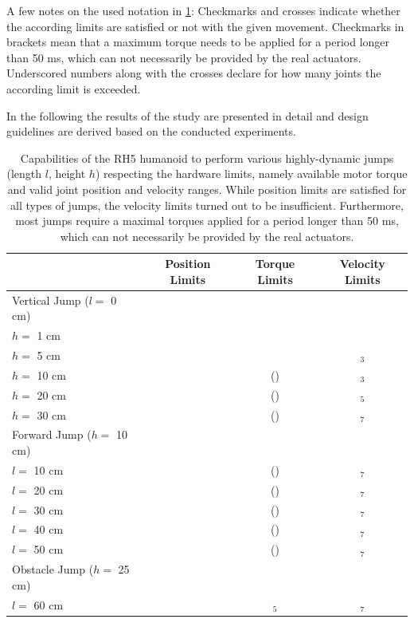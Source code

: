 A few notes on the used notation in \cref{tab:systemLimits}: Checkmarks and crosses indicate whether the according limits are satisfied or not with the given movement. Checkmarks in brackets mean that a maximum torque needs to be applied for a period longer than 50 ms, which can not necessarily be provided by the real actuators. Underscored numbers along with the crosses declare for how many joints the according limit is exceeded.

In the following the results of the study are presented in detail and design guidelines are derived based on the conducted experiments. 

\begin{table}[t]
\centering
\caption[Capabilities of the RH5 humanoid to perform highly-dynamic jumps]{Capabilities of the RH5 humanoid to perform various highly-dynamic jumps (length $l$, height $h$) respecting the hardware limits, namely available motor torque and valid joint position and velocity ranges. While position limits are satisfied for all types of jumps, the velocity limits turned out to be insufficient. Furthermore, most jumps require a maximal torques applied for a period longer than 50 ms, which can not necessarily be provided by the real actuators.}
\begin{tabular}{lccc}
\hline
& Position Limits & Torque Limits & Velocity Limits\\ \hline
Vertical Jump ($l=$ 0 cm) & & & \\
\quad\quad $h=$ 1 cm 		& \greencheckmark  & \greencheckmark & \greencheckmark \\
\quad\quad $h=$ 5 cm 		& \greencheckmark  & \greencheckmark & \redxmark$_3$ \\
\quad\quad $h=$ 10 cm 		& \greencheckmark & (\greencheckmark) & \redxmark$_3$  \\
\quad\quad $h=$ 20 cm 		& \greencheckmark  & (\greencheckmark) & \redxmark$_5$ \\
\quad\quad $h=$ 30 cm 		& \greencheckmark  & (\greencheckmark) & \redxmark$_7$ \\ \hline
Forward Jump ($h=$ 10 cm)& & & \\
\quad\quad $l=$ 10 cm 		& \greencheckmark  & (\greencheckmark) & \redxmark$_7$ \\
\quad\quad $l=$ 20 cm 		& \greencheckmark  & (\greencheckmark) & \redxmark$_7$ \\
\quad\quad $l=$ 30 cm 		& \greencheckmark  & (\greencheckmark) & \redxmark$_7$ \\
\quad\quad $l=$ 40 cm 		& \greencheckmark  & (\greencheckmark) & \redxmark$_7$ \\
\quad\quad $l=$ 50 cm 		& \greencheckmark  & (\greencheckmark) & \redxmark$_7$ \\ \hline
Obstacle Jump ($h=$ 25 cm)& & & \\
\quad\quad $l=$ 60 cm 		& \greencheckmark  & \redxmark$_5$ & \redxmark$_7$ \\ \hline
\end{tabular}
\label{tab:systemLimits}
\end{table}

